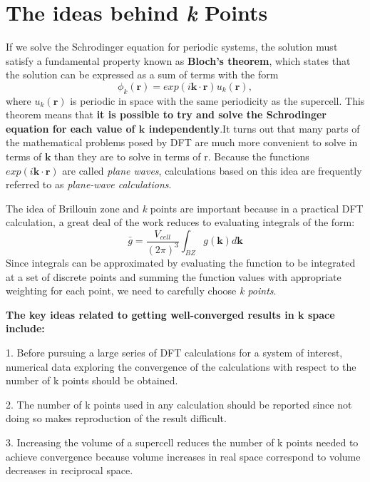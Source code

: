 \documentclass[12pt]{article}
\begin{document}
\section{The ideas behind \textit{k} Points}
If we solve the Schrodinger equation for periodic systems, the solution must satisfy a fundamental property known as \textbf{Bloch's theorem}, which states that the solution can be expressed as a sum of terms with the form
\begin{equation}
    \phi_k(\boldsymbol{r})=exp(i\boldsymbol{k}\cdot\boldsymbol{r})u_k(\boldsymbol{r}),
\end{equation}
where $u_k(\boldsymbol{r})$ is periodic in space with the same periodicity as the supercell. This theorem means that \textbf{it is possible to try and solve the Schrodinger equation for each value of $\boldsymbol{k}$ independently}.It turns out that many parts of the mathematical problems posed by DFT are much more convenient to solve in terms of $\boldsymbol{k}$ than they are to solve in terms of r. Because the functions
$exp(i\boldsymbol{k}\cdot\boldsymbol{r})$ are called \textit{plane waves}, calculations based on this idea are frequently referred to as \textit{plane-wave calculations}.

The idea of Brillouin zone and \emph{k} points are important because in a practical DFT calculation, a great deal of the work reduces to evaluating integrals of the form:
\begin{equation}
    \bar g = \frac{V_{cell}}{(2\pi)^3}\int_{BZ}g(\boldsymbol{k})d\boldsymbol{k}
\end{equation}
Since integrals can be approximated by evaluating the function to be integrated at a set of discrete points and summing the function values with appropriate weighting for each point, we need to carefully choose \emph{k points}.

\textbf{The key ideas related to getting well-converged results in k space include:}

1. Before pursuing a large series of DFT calculations for a system of interest, numerical data exploring the convergence of the calculations with respect to the number of k points should be obtained.

2. The number of k points used in any calculation should be reported since not doing so makes reproduction of the result difficult.

3. Increasing the volume of a supercell reduces the number of k points needed to achieve convergence because volume increases in real space correspond to volume decreases in reciprocal space.
\end{document}
